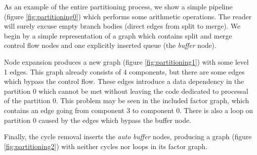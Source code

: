 As an example of the entire partitioning process, we show a simple pipeline (figure \ref{fig:partitioning0}) which performs some arithmetic operations. The reader will surely excuse empty branch bodies (direct edges from split to merge). We begin by a simple representation of a graph which contains split and merge control flow nodes and one explicitly inserted queue (the \emph{buffer} node).

Node expansion produces a new graph (figure \ref{fig:partitioning1}) with some level 1 edges. This graph already consists of 4 components, but there are some edges which bypass the control flow. These edges introduce a data dependency in the partition 0 which cannot be met without leaving the code dedicated to processal of the partition 0. This problem may be seen in the included factor graph, which contains an edge going from component 3 to component 0. There is also a loop on partition 0 caused by the edges which bypass the buffer node. 

Finally, the cycle removal inserts the \emph{auto buffer} nodes, producing a graph (figure \ref{fig:partitioning2}) with neither cycles nor loops in its factor graph.


